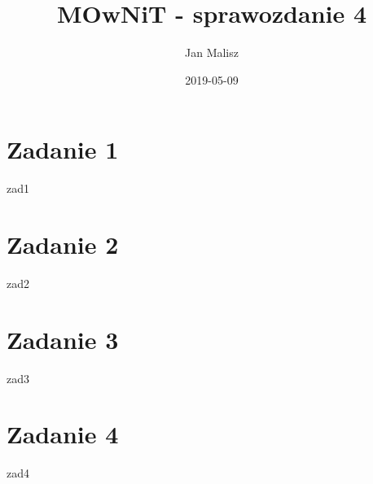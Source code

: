 \documentclass[10pt,a4paper]{article}
\title{MOwNiT - sprawozdanie 4}
\author{Jan Malisz}
\date{2019-05-09}
\begin{document}
  \maketitle
  \thispagestyle{empty}

  \newpage
  \section*{Zadanie 1}\label{sec:Zadanie1}
  {zad1}

  \newpage
  \section*{Zadanie 2}\label{sec:Zadanie2}
  {zad2}

  \newpage
  \section*{Zadanie 3}\label{sec:Zadanie3}
  {zad3}

  \newpage
  \section*{Zadanie 4}\label{sec:Zadanie4}
  {zad4}
\end{document}
